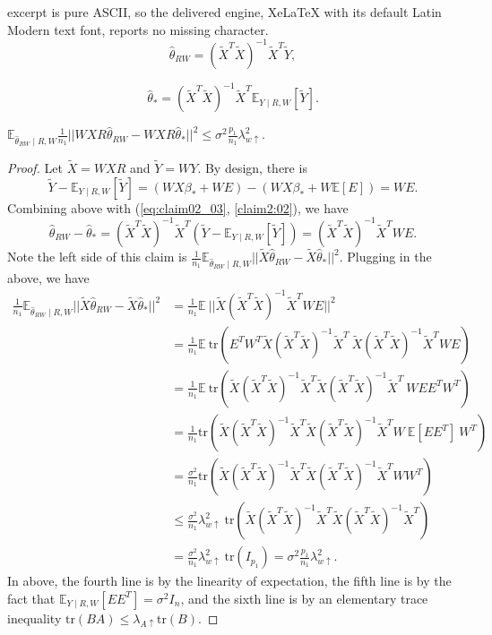 \documentclass[10pt,a4paper]{amsart}
\newcommand{\E}{\mathbb{E}}
\newcommand{\be}{\beta}
\newcommand{\hte}{\hat{\theta}}
\newcommand{\mtr}{\mathrm{tr}}
\newcommand{\tX}{\tilde{X}}
\newcommand{\tY}{\tilde{Y}}
\begin{document}
excerpt is pure ASCII, so the delivered engine, XeLaTeX with its default Latin Modern text font, reports no missing character.
\begin{equation}
\label{eq:claim02_03}
\hte_{RW} = (\tX^T \tX)^{-1} \tX^T \tY,   
\end{equation}

\begin{equation}
\label{claim2:02}
\hte_* = (\tX^T \tX)^{-1} 
\tX^T \E_{Y \mid R, W} [\tY].  
\end{equation}

\begin{claim}
\label{claim:04}
$\E_{\hte_{RW} \mid R,W} 
\frac{1}{n_1} 
|| WXR \hte_{RW} - WXR \hte_* ||^2 
\leq \sigma^2 \frac{p_1}{n_1} 
\lambda_{w \uparrow}^2$.
\end{claim}

\begin{proof}
Let $\tX = WXR$ and $\tY = WY$. 
By design, there is 
\begin{equation}
\tY - \E_{Y \mid R, W}[\tY] 
= (W X \be_* + W E)  
- (W X \be_* + W \E[E]) 
= WE.
\end{equation}
Combining above with 
(\ref{eq:claim02_03}, 
\ref{claim2:02}), we have 
\begin{equation}
\hte_{RW} - \hte_{*} 
= (\tX^T \tX)^{-1} \tX^T 
(\tY - \E_{Y \mid R, W} [\tY]) 
= (\tX^T \tX)^{-1} \tX^T W E.
\end{equation}
Note the left side of this claim 
is $\frac{1}{n_1} 
\E_{\hte_{RW} \mid R,W} 
|| \tX \hte_{RW} - \tX \hte_* ||^2$.  
Plugging in the above, we have 
\begin{equation}
\begin{split}
\frac{1}{n_1} \E_{\hte_{RW} \mid R,W}  
|| \tX \hte_{RW} - \tX \hte_* ||^2 
& = \frac{1}{n_1} \E\ ||\tX (\tX^T \tX)^{-1} \tX^T W E||^2\\ 
& = \frac{1}{n_1} \E\ \mtr ( 
E^T W^T \tX (\tX^T \tX)^{-1} \tX^T
\ \tX (\tX^T \tX)^{-1} \tX^T W E )\\
& = \frac{1}{n_1} 
\E\ \mtr ( \tX (\tX^T \tX)^{-1} \tX^T
\tX (\tX^T \tX)^{-1} \tX^T\ W E E^T W^T )\\
& = \frac{1}{n_1} 
\mtr ( \tX (\tX^T \tX)^{-1} \tX^T
\tX (\tX^T \tX)^{-1} \tX^T W\ 
\E [E E^T]\ W^T )\\
& = \frac{\sigma^2}{n_1} 
\mtr ( \tX (\tX^T \tX)^{-1} \tX^T
\tX (\tX^T \tX)^{-1} \tX^T W W^T )\\
& \leq \frac{\sigma^2}{n_1} 
\lambda^2_{w \uparrow}\ 
\mtr ( \tX (\tX^T \tX)^{-1} \tX^T
\tX (\tX^T \tX)^{-1} \tX^T )\\
& = \frac{\sigma^2}{n_1} 
\lambda^2_{w \uparrow}\ 
\mtr ( I_{p_1} ) = \sigma^2 \frac{p_1}{n_1} 
\lambda^2_{w \uparrow}.
\end{split}
\end{equation}
In above, the fourth line is by 
the linearity of expectation,  
the fifth line is by the fact 
that $\E_{Y \mid R, W} [EE^T] 
= \sigma^2 I_{n}$, and the 
sixth line is by an elementary 
trace inequality $\mtr(B A) 
\leq \lambda_{A \uparrow} 
\mtr(B)$. 
\end{proof}
\end{document}
